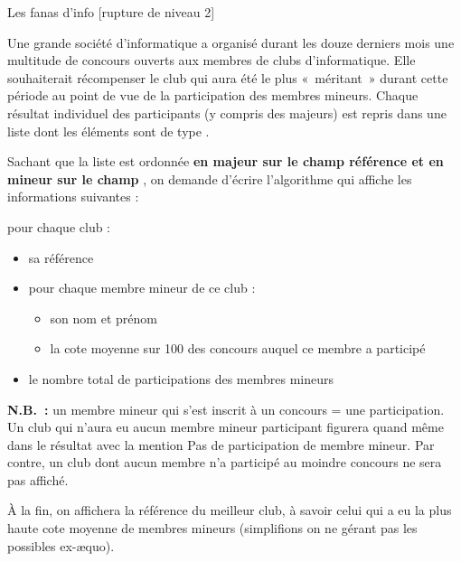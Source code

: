 \begin{Exercice}{Les fanas d'info  [rupture de niveau 2]}

	Une grande société d’informatique a organisé durant les douze derniers
	mois une multitude de concours ouverts aux membres de clubs d’informatique. 
	Elle souhaiterait récompenser le club qui aura été le plus «~méritant~» 
	durant cette période au point de vue de la participation des membres mineurs. 
	Chaque résultat individuel des participants (y compris des majeurs) est repris dans une liste
	dont les éléments sont de type .

	\begin{LDA}
	 		
	 		
		
		
	\EndStruct
	\end{LDA}

	Sachant que la liste est ordonnée \textbf{en majeur sur le champ \textsf{référence}
	et en mineur sur le champ }, 
	on demande d’écrire l’algorithme qui affiche les informations suivantes :

	pour chaque club :
	\begin{itemize}
		\item 
			sa référence
		\item 
			pour chaque membre mineur de ce club :
        \begin{itemize}
		    \item 
			   son nom et prénom
		    \item 
			   la cote moyenne sur 100 des concours auquel ce membre a participé
        \end{itemize}
		\item 
			le nombre total de participations des membres mineurs
	\end{itemize}
	
	\textbf{N.B.~:} un membre mineur qui s’est inscrit à un concours = une
	participation. Un club qui n’aura eu aucun membre mineur participant
	figurera quand même dans le résultat avec la mention 
	\og{}Pas de participation de membre mineur\fg{}. 
	Par contre, un club dont aucun membre n’a participé au moindre concours ne sera pas affiché.

	À la fin, on affichera la référence du meilleur club, à savoir celui qui
	a eu la plus haute cote moyenne de membres mineurs 
	(simplifions on ne gérant pas les possibles ex-\ae{}quo).

\end{Exercice}


